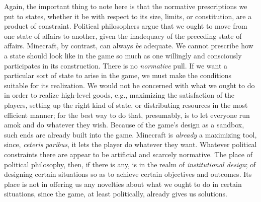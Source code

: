 Again, the important thing to note here is that the normative prescriptions we put to states, whether it be with respect to its size, limits, or constitution, are a product of constraint. Political philosophers argue that we ought to move from one state of affairs to another, given the inadequacy of the preceding state of affairs. Minecraft, by contrast, can always \emph{be} adequate. We cannot prescribe how a state should look like in the game so much as one willingly and consciously participates in its construction. There is no \emph{normative} pull. If we want a particular sort of state to arise in the game, we must make the conditions suitable for its realization. We would not be concerned with what we ought to do in order to realize high-level goods, e.g., maximizing the satisfaction of the players, setting up the right kind of state, or distributing resources in the most efficient manner; for the best way to do that, presumably, is to let everyone run amok and do whatever they wish. Because of the game’s design as a sandbox, such ends are already built into the game. Minecraft is \emph{already} a maximizing tool, since, \emph{ceteris paribus}, it lets the player do whatever they want. Whatever political constraints there are appear to be artificial and scarcely normative. The place of political philosophy, then, if there is any, is in the realm of \emph{institutional design}; of designing certain situations so as to achieve certain objectives and outcomes. Its place is not in offering us any novelties about what we ought to do in certain situations, since the game, at least politically, already gives us solutions.

